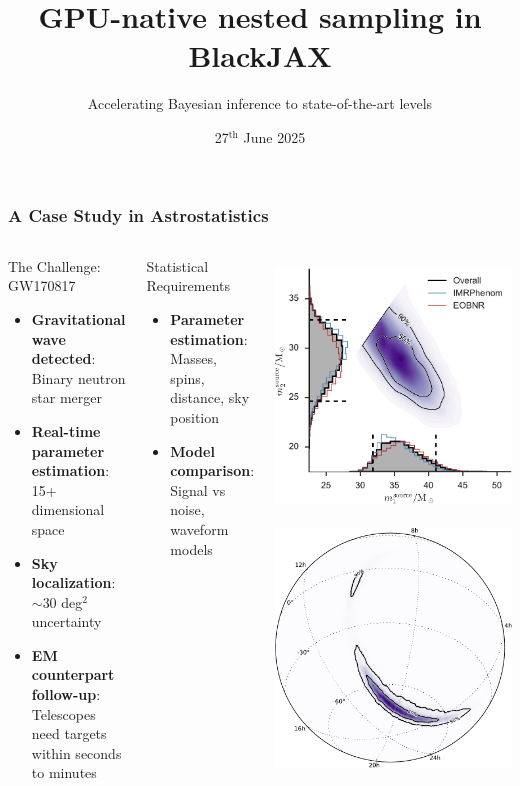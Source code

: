 \documentclass[aspectratio=169]{beamer}
\title{GPU-native nested sampling in BlackJAX}
\subtitle{Accelerating Bayesian inference to state-of-the-art levels}
\date{27$^{\text{th}}$ June 2025}
\begin{document}
\begin{frame}
    \titlepage
\end{frame}

\begin{frame}
    \frametitle{A Case Study in Astrostatistics}
    \begin{columns}
        \vspace{-10pt}
        \begin{block}{The Challenge: GW170817}
            \begin{itemize}
                \item \textbf{Gravitational wave detected}: Binary neutron star merger
                \item \textbf{Real-time parameter estimation}: 15+ dimensional space
                \item \textbf{Sky localization}: $\sim 30$ deg$^2$ uncertainty
                \item \textbf{EM counterpart follow-up}: Telescopes need targets within seconds to minutes
            \end{itemize}
        \end{block}
        \begin{block}{Statistical Requirements}
            \begin{itemize}
                \item \textbf{Parameter estimation}: Masses, spins, distance, sky position
                \item \textbf{Model comparison}: Signal vs noise, waveform models
            \end{itemize}
        \end{block}
        \includegraphics[height=0.49\textwidth]{figures/ligo_m1_m2}
        \includegraphics[height=0.49\textwidth]{figures/ligo_lambert-skymap}

\end{columns}
\end{frame}
\end{document}

